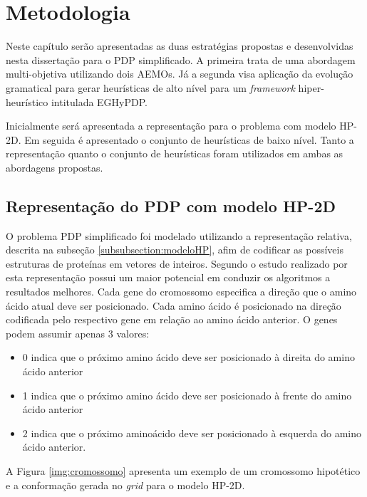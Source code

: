 \chapter{Metodologia}
\label{cap:Metodologia}

Neste capítulo serão apresentadas as duas estratégias propostas e desenvolvidas nesta dissertação para o PDP simplificado. A primeira trata de uma abordagem multi-objetiva utilizando dois AEMOs. Já a segunda visa aplicação da evolução gramatical  para gerar heurísticas de alto nível para um \textit{framework} hiper-heurístico intitulada EGHyPDP.

Inicialmente será apresentada a representação para o problema com modelo HP-2D. Em seguida é apresentado o conjunto de heurísticas de baixo nível. Tanto a representação quanto o conjunto de heurísticas foram utilizados em ambas as abordagens propostas.

\section{Representação do PDP com modelo HP-2D}

O problema PDP simplificado foi modelado utilizando a representação relativa, descrita na subseção \ref{subsubsection:modeloHP}, afim de codificar as possíveis estruturas de proteínas em vetores de inteiros. Segundo o estudo realizado por  \cite{krasnogor1999protein} esta representação possui um maior potencial em conduzir os algoritmos a resultados melhores. Cada gene do cromossomo especifica a direção que o amino ácido atual deve ser posicionado. Cada amino ácido é posicionado na direção codificada pelo respectivo gene em relação ao amino ácido anterior. O genes podem assumir apenas 3 valores:

\begin{itemize}
	\item 0 indica que o próximo amino ácido deve ser posicionado à direita do amino ácido anterior
	\item 1 indica que o próximo amino ácido deve ser posicionado à frente do amino ácido anterior
	\item 2 indica que o próximo aminoácido deve ser posicionado à esquerda do amino ácido anterior.
\end{itemize}

A Figura \ref{img:cromossomo} apresenta um exemplo de um cromossomo hipotético e a conformação gerada no \textit{grid} para o modelo HP-2D.


